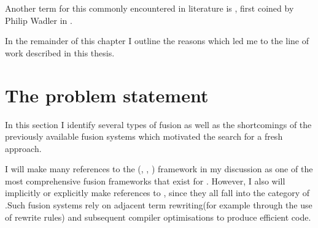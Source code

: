 \documentclass[preamble.tex]{subfiles}
\begin{document}
Another term for this commonly encountered in literature is , first coined by Philip Wadler in \cite{Wad90}.


In the remainder of this chapter I outline the reasons which led me to the line of work described in this thesis.








\clearpage
\section{The problem statement}
\label{sec:problems}

In this section I identify several types of fusion as well as the shortcomings of the previously available fusion systems which motivated the search for a fresh approach.

I will make many references to the \StreamFusion\isf (\cite{CLS07}, \cite{CSL06}, \cite{VectorStreamFusion}) framework in my discussion as one of the most comprehensive fusion frameworks that exist for \Haskell. However, I also will implicitly or explicitly make references to  \cite{GLP93},  \cite{CK01} since they all fall into the category of .\ieqf Such fusion systems rely on adjacent term rewriting\irw (for example through the use of rewrite rules\irwrules \cite{PTH01}) and subsequent compiler optimisations to produce efficient code.
\end{document}
